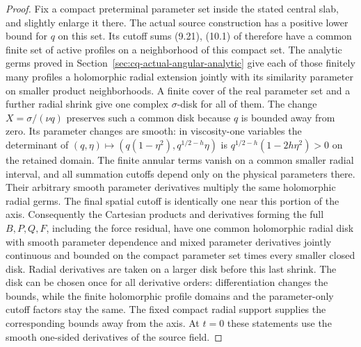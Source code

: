 \begin{proof}
Fix a compact preterminal parameter set inside the stated central
slab, and slightly enlarge it there. The actual source construction
has a positive lower bound for $q$ on this set. Its cutoff sums
(9.21), (10.1) of \cite{cqNS2026} therefore have a common finite
set of active profiles on a neighborhood of this compact set.
The analytic germs proved in Section~\ref{sec:cq-actual-angular-analytic}
give each of those finitely many profiles a holomorphic radial
extension jointly with its similarity parameter on smaller product
neighborhoods. A finite cover of the real parameter set and a
further radial shrink give one complex $\sigma$-disk for all of
them. The change $X=\sigma/(\nu q)$ preserves such a common
disk because $q$ is bounded away from zero. Its parameter changes
are smooth: in viscosity-one variables the determinant of
$(q,\eta)\mapsto(q(1-\eta^2),q^{1/2-h}\eta)$ is
$q^{1/2-h}(1-2h\eta^2)>0$ on the retained domain.
The finite annular terms vanish on a common smaller radial
interval, and all summation cutoffs depend only on the physical
parameters there. Their arbitrary smooth parameter derivatives
multiply the same holomorphic radial germs. The final spatial
cutoff is identically one near this portion of the axis.
Consequently the Cartesian products and derivatives forming the
full $B,P,Q,F$, including the force residual, have one common
holomorphic radial disk with smooth parameter dependence and
mixed parameter derivatives jointly continuous and bounded on the
compact parameter set times every smaller closed disk. Radial
derivatives are taken on a larger disk before this last shrink.
The disk can be chosen once for all derivative orders: differentiation
changes the bounds, while the finite holomorphic profile domains
and the parameter-only cutoff factors stay the same. The fixed
compact radial support supplies the corresponding bounds away
from the axis. At $t=0$ these statements use the smooth one-sided
derivatives of the source field.


\end{proof}
